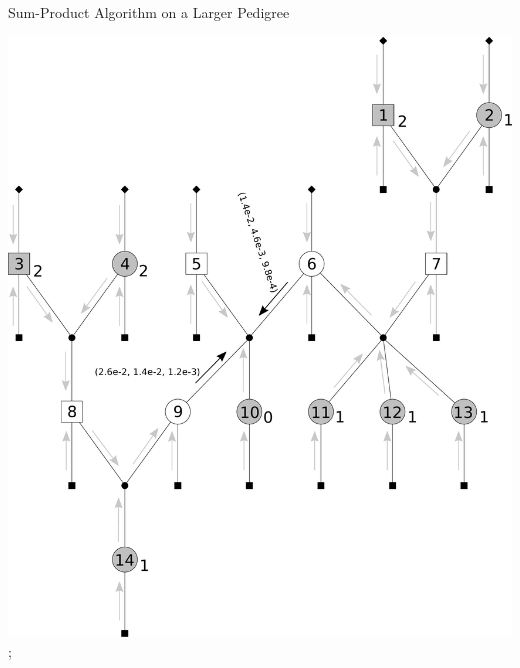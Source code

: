 \documentclass[letter,graphicx]{beamer}
\begin{document}
\begin{frame}{Sum-Product Algorithm on a Larger Pedigree} 
\begin{center} 
\includegraphics[height = 0.8\textheight]{./images/mg-example-step6.pdf}; 
\end{center}
\end{frame}
\end{document}
